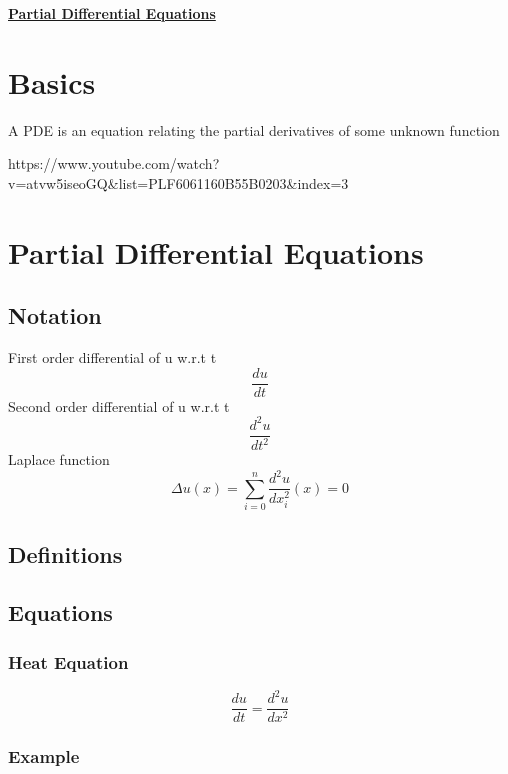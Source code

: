 \documentclass[10pt,a4paper]{report}
\begin{document}
	\begin{center}
		\underline{\textbf{Partial Differential Equations}}
	\end{center}
	
	\tableofcontents

\chapter{Basics}

A PDE is an equation relating the partial derivatives of some unknown function

https://www.youtube.com/watch?v=atvw5iseoGQ\&list=PLF6061160B55B0203\&index=3

\chapter{Partial Differential Equations}

\section{Notation}
First order differential of u w.r.t t
\begin{equation}
	\frac{du}{dt}
\end{equation}
Second order differential of u w.r.t t
\begin{equation}
	\frac{d^2u}{dt^2}
\end{equation}
Laplace function
\begin{equation}
	\Delta u (x) = \sum_{i=0}^{n} \frac{d^2u}{dx_i^2} (x) = 0
\end{equation}

\section{Definitions}

\section{Equations}

\subsection{Heat Equation}

\begin{equation}
	\frac{du}{dt} = \frac{d^2u}{dx^2}
\end{equation}

\subsection*{Example}
\end{document}
